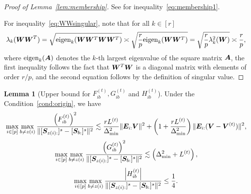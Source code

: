 \documentclass[lettersize,onecolumn,journal]{IEEEtran}
\theoremstyle{definition}
\newtheorem{lem}{Lemma}
\theoremstyle{definition}
\newcommand{\of}[1]{\left(#1\right)}
\newcommand{\aabs}[1]{\left|#1\right|}
\begin{document}
\begin{proof}[Proof of Lemma~\ref{lem:membership}] See \citet[Proof of Lemma 4]{han2020exact} for inequality~\eqref{eq:membership1}.

For inequality~\eqref{eq:WWsingular}, note that for all $k \in [r]$
\begin{align}
    \lambda_k(\bm{W}\bm{W}^T) = \sqrt{\text{eigen}_k (\bm{W} \bm{W}^T\bm{W}\bm{W}^T)} \asymp \sqrt{\frac{r}{p} \text{eigen}_k (\bm{W} \bm{W}^T)} = \sqrt{\frac{r}{p} \lambda^2_k(\bm{W})} \asymp \frac{r}{p},
\end{align}
where $\text{eigen}_k(\bm A)$ denotes the $k$-th largest eigenvalue of the square matrix $\bm A$, the first inequality follows the fact that $\bm{W}^T\bm{W}$ is a diagonal matrix with elements of order $r/p$, and the second equation follows by the definition of singular value.
\end{proof}

\begin{lem}[Upper bound for $F_{ib}^{(t)}, G_{ib}^{(t)}$ and $H_{ib}^{(t)}$]\label{lem:upper_fgh} Under the Condition~\ref{cond:origin}, we have 
    \begin{equation}\label{eq:fib}
        \max_{i \in [p]} \max_{b \neq z(i)} \frac{\of{F_{ib}^{(t)}}^2}{ \onormSize{}{ [  \mS_{z(i):} ]^s  -  [ \mS_{b:} ]^s }^2 } \lesssim  \frac{r L^{(t)}}{ \Delta_{\min}^2} \onormSize{}{\mE_{i:} \mV}^2 + \of{1 +  \frac{ r L^{(t)}}{ \Delta_{\min}^2}} \onormSize{}{\mE_{i:} (\mV - \mV^{(t)})}^2 ,
    \end{equation}
    \begin{equation}\label{eq:gib}
        \max_{i \in [p]} \max_{b \neq z(i)} \frac{ \of{  G_{ib}^{(t)} }^2  }{ \onormSize{}{ [\mS_{z(i):} ]^s - [\mS_{b:}]^s }^2}  \lesssim \of{ \Delta_{\min}^2 +L^{(t)}},
    \end{equation}
    \begin{equation}\label{eq:hib}
        \max_{i \in [p]} \max_{b \neq z(i)}  \frac{ \aabs{  H_{ib}^{(t)} }  }{ \onormSize{}{ [\mS_{z(i):} ]^s - [\mS_{b:}]^s }^2} \leq \frac{1}{4}.
    \end{equation}
    \end{lem}
    
\end{document}
